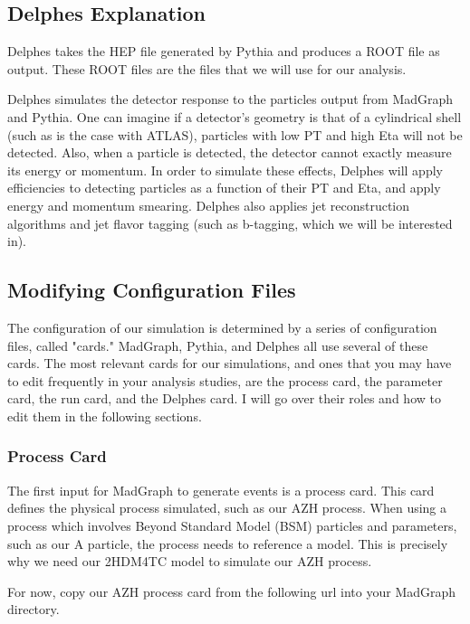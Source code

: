 \documentclass{article}
\begin{document}
\subsection{Delphes Explanation}

Delphes takes the HEP file generated by Pythia and produces a ROOT file as output. These ROOT files are the files
that we will use for our analysis.

\bigskip

Delphes simulates the detector response to the particles output from MadGraph and Pythia. One can imagine if a detector's 
geometry is that of a cylindrical shell (such as is the case with ATLAS), particles
with low PT and high Eta will not be detected. Also, when a particle is detected, the detector cannot exactly measure its
energy or momentum. In order to simulate these effects, Delphes will apply efficiencies to detecting particles as a function
of their PT and Eta, and apply energy and momentum smearing. Delphes also applies jet reconstruction algorithms and jet flavor
tagging (such as b-tagging, which we will be interested in).

\subsection{Modifying Configuration Files}

The configuration of our simulation is determined by a series of configuration
files, called "cards." MadGraph, Pythia, and Delphes all use several of these cards.
The most relevant cards for our simulations, and ones that you may have to edit frequently
in your analysis studies, are the process card, the parameter card, the run card, and the
Delphes card. I will go over their roles and how to edit them in the following sections.

\subsubsection{Process Card}

The first input for MadGraph to generate events is a process card. This card defines the
physical process simulated, such as our AZH process. When using a process which involves
Beyond Standard Model (BSM) particles and parameters, such as our A particle, the process
needs to reference a model. This is precisely why we need our 2HDM4TC model to simulate our AZH process.

\bigskip

For now, copy our AZH process card from the following url into your MadGraph directory.
\end{document}
